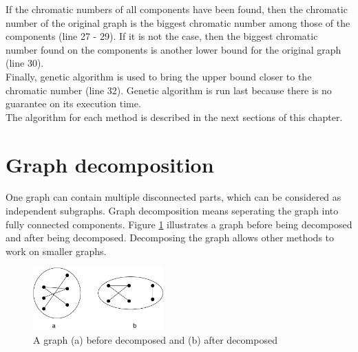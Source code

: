 \documentclass[a4paper]{report}
\begin{document}
	If the chromatic numbers of all components have been found, then the chromatic number of the original graph is the biggest chromatic number among those of the components (line 27 - 29). If it is not the case, then the biggest chromatic number found on the components is another lower bound for the original graph (line 30).\\
	
	Finally, genetic algorithm is used to bring the upper bound closer to the chromatic number (line 32). Genetic algorithm is run last because there is no guarantee on its execution time.\\
	
	The algorithm for each method is described in the next sections of this chapter.
	

		\section{Graph decomposition}
		One graph can contain multiple disconnected parts, which can be considered as independent subgraphs. Graph decomposition means seperating the graph into fully connected components. Figure \ref{fig:decompose} illustrates a graph before being decomposed and after being decomposed. Decomposing the graph allows other methods to work on smaller graphs.\\
		
		\begin{figure}[h]
			\centering
			\includegraphics[width=50mm,scale=0.5]{figures/DecomposedGraph.pdf}
			\caption{A graph (a) before decomposed and (b) after decomposed}
			\label{fig:decompose}
		\end{figure}
	
\end{document}
